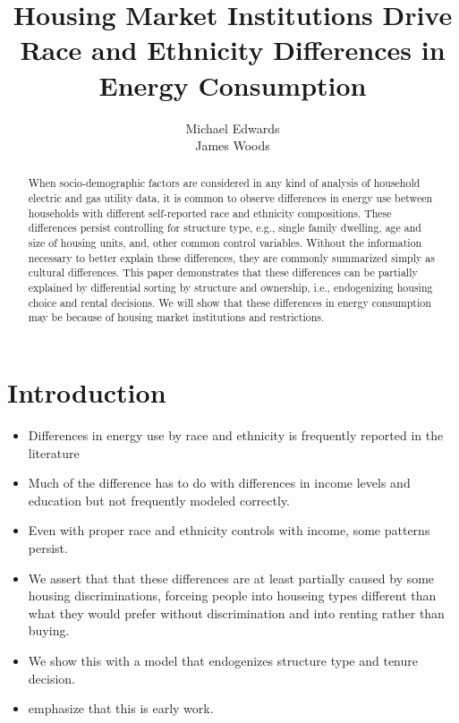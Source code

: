 \documentclass{article}
\author{Michael Edwards\\ 
  James Woods}
\title{Housing Market Institutions Drive Race and Ethnicity Differences in Energy Consumption}
\begin{document}
\maketitle


\begin{abstract}

When socio-demographic factors are considered in any kind of analysis of household electric and gas utility data, it is common to observe differences in energy use between households with different self-reported race and ethnicity compositions. These differences persist controlling for structure type, e.g., single family dwelling, age and size of housing units, and, other common control variables. Without the information necessary to better explain these differences, they are commonly summarized simply as cultural differences. This paper demonstrates that these differences can be partially explained by differential sorting by structure and ownership, i.e., endogenizing housing choice and rental decisions. We will show that these differences in energy consumption may be because of housing market institutions and restrictions.
\end{abstract}

\section{Introduction}


\begin{itemize}

  \item Differences in energy use by race and ethnicity is frequently reported in the literature
  \item Much of the difference has to do with differences in income levels and education but not frequently modeled correctly.
  \item Even with proper race and ethnicity controls with income, some patterns persist.
  \item We assert that that these differences are at least partially caused by some housing discriminations, forceing people into houseing types different than what they would prefer without discrimination and into renting rather than buying.
  \item We show this with a model that endogenizes structure type and tenure decision.
  \item emphasize that this is early work.
\end{itemize}
\end{document}
